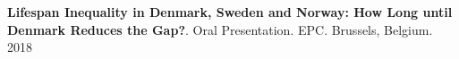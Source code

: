 \documentclass[12pt]{article}
\begin{document}
\textbf{Lifespan Inequality in Denmark, Sweden and Norway: How Long until Denmark Reduces the Gap?}. Oral Presentation. EPC. Brussels, Belgium. \hfill { 2018}\\


%
%
%
%
%
%
%
%
%
%
%
%
\end{document}
